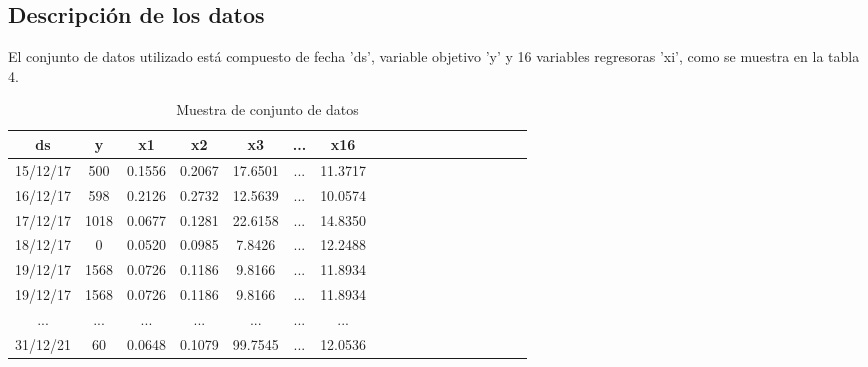 \documentclass[twoside,11pt]{article}
\begin{document}
\subsection{Descripción de los datos}
El conjunto de datos utilizado está compuesto de fecha 'ds', variable objetivo 'y' y 16 variables regresoras 'xi', como se muestra en la tabla 4.
\begin{table}[htbp]
\centering
\caption{Muestra de conjunto de datos}
\label{tab:datos}
\begin{tabular}{cccccccccccccccccc}
\toprule
ds & y & x1 & x2 & x3 & ... & x16 \\
\midrule
15/12/17 & 500 & 0.1556 & 0.2067 & 17.6501 & ... & 11.3717 \\
16/12/17 & 598 & 0.2126 & 0.2732 & 12.5639 &  ... & 10.0574 \\
17/12/17 & 1018 & 0.0677 & 0.1281 & 22.6158 & ... & 14.8350 \\
18/12/17 & 0 & 0.0520 & 0.0985 & 7.8426 & ... & 12.2488 \\
19/12/17 & 1568 & 0.0726 & 0.1186 & 9.8166 & ... & 11.8934 \\
19/12/17 & 1568 & 0.0726 & 0.1186 & 9.8166 & ... & 11.8934 \\
... & ... & ... & ... & ... & ... & ... \\
31/12/21 & 60 & 0.0648	& 0.1079 & 99.7545 & ... &	12.0536 \\
\bottomrule
\end{tabular}
\end{table}
\end{document}
